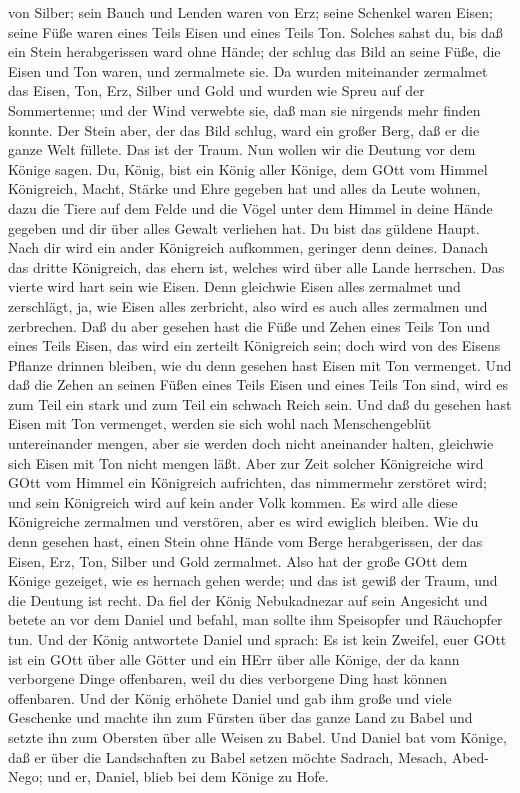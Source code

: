von Silber; sein Bauch und Lenden waren von Erz;  seine
Schenkel waren Eisen; seine Füße waren eines Teils Eisen und eines Teils
Ton.  Solches sahst du, bis daß ein Stein herabgerissen
ward ohne Hände; der schlug das Bild an seine Füße, die Eisen und Ton
waren, und zermalmete sie.  Da wurden miteinander zermalmet
das Eisen, Ton, Erz, Silber und Gold und wurden wie Spreu auf der
Sommertenne; und der Wind verwebte sie, daß man sie nirgends mehr finden
konnte. Der Stein aber, der das Bild schlug, ward ein großer Berg, daß
er die ganze Welt füllete.  Das ist der Traum. Nun wollen
wir die Deutung vor dem Könige sagen.  Du, König, bist ein
König aller Könige, dem GOtt vom Himmel Königreich, Macht, Stärke und
Ehre gegeben hat  und alles da Leute wohnen, dazu die Tiere
auf dem Felde und die Vögel unter dem Himmel in deine Hände gegeben und
dir über alles Gewalt verliehen hat. Du bist das güldene Haupt.
 Nach dir wird ein ander Königreich aufkommen, geringer
denn deines. Danach das dritte Königreich, das ehern ist, welches wird
über alle Lande herrschen.  Das vierte wird hart sein wie
Eisen. Denn gleichwie Eisen alles zermalmet und zerschlägt, ja, wie
Eisen alles zerbricht, also wird es auch alles zermalmen und zerbrechen.
 Daß du aber gesehen hast die Füße und Zehen eines Teils
Ton und eines Teils Eisen, das wird ein zerteilt Königreich sein; doch
wird von des Eisens Pflanze drinnen bleiben, wie du denn gesehen hast
Eisen mit Ton vermenget.  Und daß die Zehen an seinen Füßen
eines Teils Eisen und eines Teils Ton sind, wird es zum Teil ein stark
und zum Teil ein schwach Reich sein.  Und daß du gesehen
hast Eisen mit Ton vermenget, werden sie sich wohl nach Menschengeblüt
untereinander mengen, aber sie werden doch nicht aneinander halten,
gleichwie sich Eisen mit Ton nicht mengen läßt.  Aber zur
Zeit solcher Königreiche wird GOtt vom Himmel ein Königreich aufrichten,
das nimmermehr zerstöret wird; und sein Königreich wird auf kein ander
Volk kommen. Es wird alle diese Königreiche zermalmen und verstören,
aber es wird ewiglich bleiben.  Wie du denn gesehen hast,
einen Stein ohne Hände vom Berge herabgerissen, der das Eisen, Erz, Ton,
Silber und Gold zermalmet. Also hat der große GOtt dem Könige gezeiget,
wie es hernach gehen werde; und das ist gewiß der Traum, und die Deutung
ist recht.  Da fiel der König Nebukadnezar auf sein
Angesicht und betete an vor dem Daniel und befahl, man sollte ihm
Speisopfer und Räuchopfer tun.  Und der König antwortete
Daniel und sprach: Es ist kein Zweifel, euer GOtt ist ein GOtt über alle
Götter und ein HErr über alle Könige, der da kann verborgene Dinge
offenbaren, weil du dies verborgene Ding hast können offenbaren.
 Und der König erhöhete Daniel und gab ihm große und viele
Geschenke und machte ihn zum Fürsten über das ganze Land zu Babel und
setzte ihn zum Obersten über alle Weisen zu Babel.  Und
Daniel bat vom Könige, daß er über die Landschaften zu Babel setzen
möchte Sadrach, Mesach, Abed-Nego; und er, Daniel, blieb bei dem Könige
zu Hofe.

